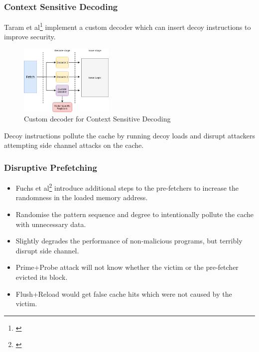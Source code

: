 \documentclass[10pt,usenames,dvipsnames]{beamer}
\begin{document}
\begin{frame}
\frametitle{Context Sensitive Decoding}
Taram et al\footnote{\cite{csd}} implement a custom decoder which can insert decoy
instructions to improve security.
\begin{figure}
\centering
\includegraphics[width=0.4\textwidth]{csd}
\caption{Custom decoder for Context Sensitive Decoding}
\end{figure}
Decoy instructions pollute the cache by running decoy loads and
disrupt attackers attempting side channel attacks on the cache.
\end{frame}

\begin{frame}
\frametitle{Disruptive Prefetching}
\begin{itemize}
\item Fuchs et al\footnote{\cite{disruptive_prefetch}} introduce additional steps to the pre-fetchers to increase the randomness
in the loaded memory address.
\item Randomise the pattern sequence and degree to intentionally pollute the cache with unnecessary data.
\item Slightly degrades the performance of non-malicious programs, but terribly disrupt side channel.
\item Prime+Probe attack will not know whether the victim or the pre-fetcher evicted its block.
\item Flush+Reload would get false cache hits which were not caused by the victim.
\end{itemize}
\end{frame}
\end{document}
